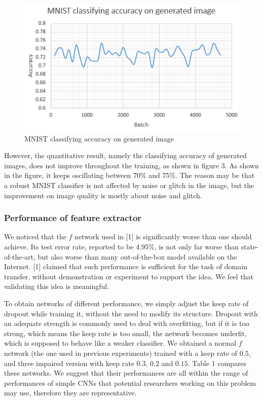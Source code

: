 \documentclass{article}
\begin{document}
\begin{figure}[H]
	\centering
	\includegraphics[width = 10 cm]{img/plot1.png}
	\caption{MNIST classifying accuracy on generated image}
\end{figure}

However, the quantitative result, namely the classifying accuracy of generated images, does not improve throughout the training, as shown in figure 3. As shown in the figure, it keeps oscillating between 70\% and 75\%. The reason may be that a robust MNIST classifier is not affected by noise or glitch in the image, but the improvement on image quality is mostly about noise and glitch. 

\subsubsection{Performance of feature extractor}

We noticed that the $f$ network used in [1] is significantly worse than one should achieve. Its test error rate, reported to be 4.95\%, is not only far worse than state-of-the-art, but also worse than many out-of-the-box model available on the Internet. [1] claimed that such performance is sufficient for the task of domain transfer, without demonstration or experiment to support the idea. We feel that validating this idea is meaningful.

To obtain networks of different performance, we simply adjust the keep rate of dropout while training it, without the need to modify its structure. Dropout with an adequate strength is commonly used to deal with overfitting, but if it is too strong, which means the keep rate is too small, the network becomes underfit, which is supposed to behave like a weaker classifier. We obtained a normal $f$ network (the one used in previous experiments) trained with a keep rate of $0.5$, and three impaired version with keep rate $0.3$, $0.2$ and $0.15$. Table 1 compares these networks. We suggest that their performances are all within the range of performances of simple CNNs that potential researchers working on this problem may use, therefore they are representative.
\end{document}
